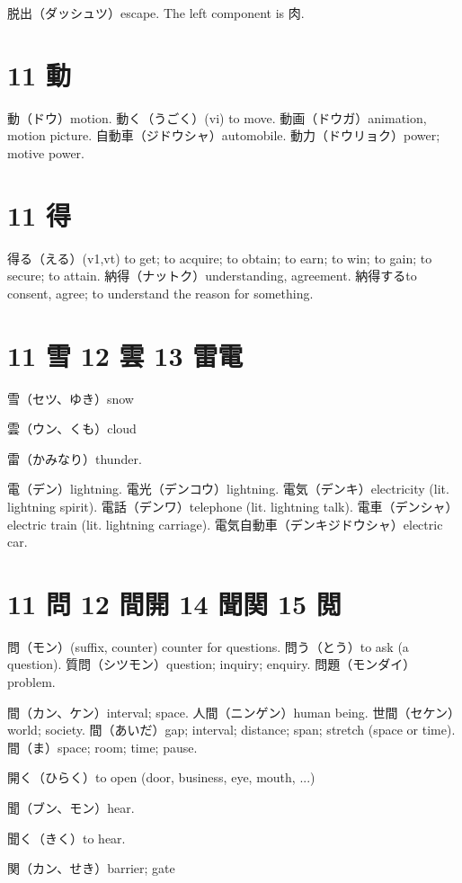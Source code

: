 脱出（ダッシュツ）escape.
The left component is 肉.

\section{11 動}

動（ドウ）motion.
動く（うごく）(vi) to move.
動画（ドウガ）animation, motion picture.
自動車（ジドウシャ）automobile.
動力（ドウリョク）power; motive power.

\section{11 得}

得る（える）(v1,vt) to get; to acquire; to obtain; to earn; to win; to gain; to secure; to attain.
納得（ナットク）understanding, agreement.
納得するto consent, agree; to understand the reason for something.

\section{11 雪 12 雲 13 雷電}

雪（セツ、ゆき）snow

雲（ウン、くも）cloud

雷（かみなり）thunder.

電（デン）lightning.
電光（デンコウ）lightning.
電気（デンキ）electricity (lit. lightning spirit).
電話（デンワ）telephone (lit. lightning talk).
電車（デンシャ）electric train (lit. lightning carriage).
電気自動車（デンキジドウシャ）electric car.

\section{11 問 12 間開 14 聞関 15 閲}

問（モン）(suffix, counter) counter for questions.
問う（とう）to ask (a question).
質問（シツモン）question; inquiry; enquiry.
問題（モンダイ）problem.

間（カン、ケン）interval; space.
人間（ニンゲン）human being.
世間（セケン）world; society.
間（あいだ）gap; interval; distance; span; stretch (space or time).
間（ま）space; room; time; pause.

開く（ひらく）to open (door, business, eye, mouth, ...)

聞（ブン、モン）hear.

聞く（きく）to hear.

関（カン、せき）barrier; gate

